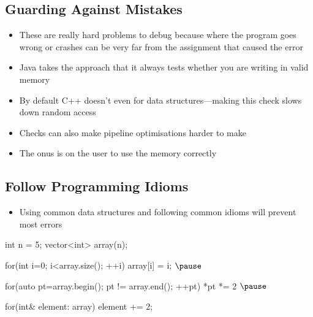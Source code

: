 
\begin{slide}
\section{Guarding Against Mistakes}

\begin{PauseHighLight}
  \begin{itemize}
  \item These are really hard problems to debug because where the
    program goes wrong or crashes can be very far from the assignment
    that caused the error\pause
  \item Java takes the approach that it always tests whether you are
    writing in valid memory\pause
  \item By default C++ doesn't even for data structures\pause---making
    this check slows down random access\pause
  \item Checks can also make pipeline optimisations harder to
    make\pause
  \item The onus is on the user to use the memory correctly\pause
   \end{itemize}
\end{PauseHighLight}

\end{slide}


\begin{slide}
\section{Follow Programming Idioms}

\begin{PauseHighLight}
  \begin{itemize}
  \item Using common data structures and following common idioms will
    prevent most errors
  \end{itemize}
  \begin{cpp}
    int n = 5;
    vector<int> array(n);
    
    for(int i=0; i<array.size(); ++i) {
      array[i] = i;
    }$\pause$

    for(auto pt=array.begin(); pt != array.end(); ++pt){
      *pt *= 2
    }$\pause$
      
    for(int& element: array) {
      element += 2;
    }
  \end{cpp}\pause

  
\end{PauseHighLight}

\end{slide}


